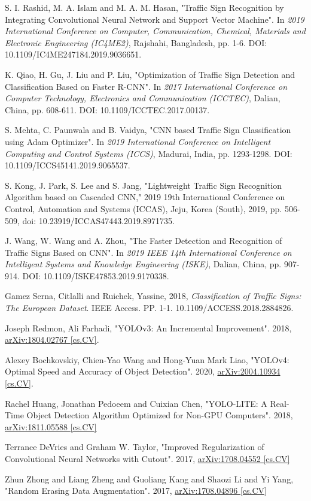\documentclass[10pt,twocolumn,letterpaper]{article}
\begin{document}
\begin{thebibliography}{9}
		S. I. Rashid, M. A. Islam and M. A. M. Hasan, "Traffic Sign Recognition by Integrating Convolutional Neural Network and Support Vector Machine". In  \textit{2019 International Conference on Computer, Communication, Chemical, Materials and Electronic Engineering (IC4ME2)}, Rajshahi, Bangladesh, pp. 1-6. DOI: 10.1109/IC4ME247184.2019.9036651.
	
		K. Qiao, H. Gu, J. Liu and P. Liu, "Optimization of Traffic Sign Detection and Classification Based on Faster R-CNN". In \textit{2017 International Conference on Computer Technology, Electronics and Communication (ICCTEC)}, Dalian, China, pp. 608-611. DOI: 10.1109/ICCTEC.2017.00137.
		
		S. Mehta, C. Paunwala and B. Vaidya, "CNN based Traffic Sign Classification using Adam Optimizer". In \textit{2019 International Conference on Intelligent Computing and Control Systems (ICCS)}, Madurai, India, pp. 1293-1298. DOI: 10.1109/ICCS45141.2019.9065537.
		
	S. Kong, J. Park, S. Lee and S. Jang, "Lightweight Traffic Sign Recognition Algorithm based on Cascaded CNN," 2019 19th International Conference on Control, Automation and Systems (ICCAS), Jeju, Korea (South), 2019, pp. 506-509, doi: 10.23919/ICCAS47443.2019.8971735.
	
		J. Wang, W. Wang and A. Zhou, "The Faster Detection and Recognition of Traffic Signs Based on CNN". In \textit{2019 IEEE 14th International Conference on Intelligent Systems and Knowledge Engineering (ISKE)}, Dalian, China, pp. 907-914. DOI: 10.1109/ISKE47853.2019.9170338.
		
		Gamez Serna, Citlalli and Ruichek, Yassine, 2018, \textit{Classification of Traffic Signs: The European Dataset}. IEEE Access. PP. 1-1. 10.1109/ACCESS.2018.2884826. 
		
		Joseph Redmon, Ali Farhadi, "YOLOv3: An Incremental Improvement". 2018, \href{https://arxiv.org/abs/1804.02767}{arXiv:1804.02767 [cs.CV]}.
		
		Alexey Bochkovskiy, Chien-Yao Wang and Hong-Yuan Mark Liao, "YOLOv4: Optimal Speed and Accuracy of Object Detection". 2020, \href{https://arxiv.org/abs/2004.10934}{arXiv:2004.10934 [cs.CV]}.
		
		Rachel Huang, Jonathan Pedoeem and Cuixian Chen, "YOLO-LITE: A Real-Time Object Detection Algorithm Optimized for Non-GPU Computers". 2018, \href{https://arxiv.org/abs/1811.05588}{arXiv:1811.05588 [cs.CV]}
		
		Terrance DeVries and Graham W. Taylor, "Improved Regularization of Convolutional Neural Networks with Cutout". 2017,
		\href{https://arxiv.org/abs/1708.04552}{arXiv:1708.04552 [cs.CV]}
		
		Zhun Zhong and Liang Zheng and Guoliang Kang and Shaozi Li and Yi Yang, "Random Erasing Data Augmentation". 2017,
		\href{https://arxiv.org/abs/1708.04896}{arXiv:1708.04896 [cs.CV]}
	
\end{thebibliography}


{\small


}
\end{document}
